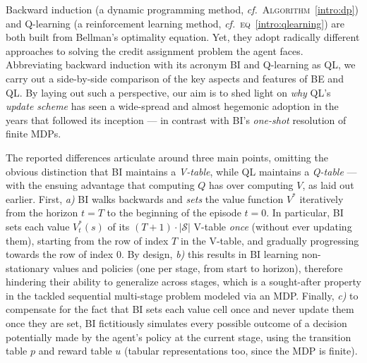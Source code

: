 Backward induction (a dynamic programming method, \textit{cf.}~\textsc{Algorithm}~\ref{intro:dp})
and Q-learning (a reinforcement learning method, \textit{cf.}~\textsc{eq}~\ref{intro:qlearning})
are both built from Bellman's optimality equation.
Yet, they adopt radically different approaches to solving the credit assignment problem the agent faces.
Abbreviating backward induction with its acronym BI and Q-learning as QL,
we carry out a side-by-side comparison of the key aspects and features of BE and QL.
By laying out such a perspective, our aim is to shed light on \emph{why} QL's \emph{update scheme}
has seen a wide-spread and almost hegemonic adoption in the years that followed its inception
--- in contrast with BI's \emph{one-shot} resolution of finite MDPs.

The reported differences articulate around three main points,
omitting the obvious distinction that BI maintains a \emph{V-table},
while QL maintains a \emph{Q-table} --- with the ensuing advantage that computing $Q$ has over
computing $V$, as laid out earlier.
First, \textit{a)} BI walks backwards and \emph{sets} the value function $V^*$ iteratively
from the horizon $t=T$ to the beginning of the episode $t=0$.
In particular, BI sets each value $V_t^*(s)$ of its $(T+1) \cdot |\mathcal{S}|$ V-table \emph{once}
(without ever updating them), starting from the row of index $T$ in the V-table,
and gradually progressing towards the row of index $0$.
By design, \textit{b)} this results in BI learning non-stationary values and policies (one per stage,
from start to horizon),
therefore hindering their ability to generalize across stages,
which is a sought-after property in the tackled sequential multi-stage problem modeled via an MDP.
Finally, \textit{c)} to compensate for the fact that BI sets each value cell once and never update them
once they are set, BI fictitiously simulates every possible outcome of a decision
potentially made by the agent's policy
at the current stage, using the transition table $p$ and reward table $u$
(tabular representations too, since the MDP is finite).

